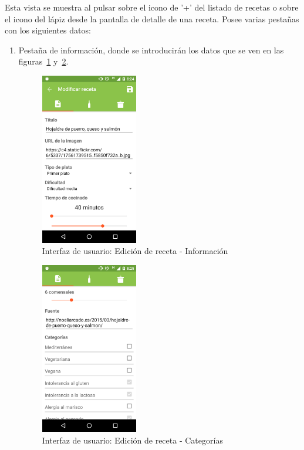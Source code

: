 Esta vista se muestra al pulsar sobre el icono de '+' del listado de recetas o
sobre el icono del lápiz desde la pantalla de detalle de una receta. Posee
varias pestañas con los siguientes datos:
\begin{enumerate}
\item Pestaña de información, donde se introducirán los datos que se ven en las
  figuras~\ref{fig:captura_20} y~\ref{fig:captura_21}.

\begin{figure}[htbp]
  \centering
  \includegraphics[width=0.4\textwidth]{cap5/img/captura_20}
  \caption{Interfaz de usuario: Edición de receta - Información}
  \label{fig:captura_20}
\end{figure}

\begin{figure}[htbp]
  \centering
  \includegraphics[width=0.4\textwidth]{cap5/img/captura_21}
  \caption{Interfaz de usuario: Edición de receta - Categorías}
  \label{fig:captura_21}
\end{figure}


\end{enumerate}
